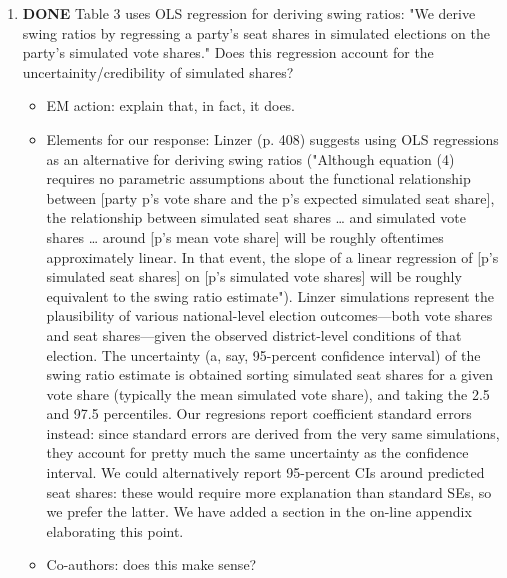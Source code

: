 \documentclass{article}
\begin{document}
\begin{enumerate}
\begin{itemize}
\end{itemize}
\item {\bfseries\sffamily DONE} Table 3 uses OLS regression for deriving swing ratios: "We derive swing ratios by regressing a party's seat shares in simulated elections on the party's simulated vote shares." Does this regression account for the uncertainity/credibility of simulated shares?
\label{sec:orgheadline29}
\begin{itemize}
\item EM action: explain that, in fact, it does.
\item Elements for our response: Linzer (p. 408) suggests using OLS regressions as an alternative for deriving swing ratios ("Although equation (4) requires no parametric assumptions about the functional relationship between [party p's vote share and the p's expected simulated seat share], the relationship between simulated seat shares \ldots{} and simulated vote shares \ldots{} around [p's mean vote share] will be roughly oftentimes approximately linear. In that event, the slope of a linear regression of [p's simulated seat shares] on [p's simulated vote shares] will be roughly equivalent to the swing ratio estimate"). Linzer simulations represent the plausibility of various national-level election outcomes---both vote shares and seat shares---given the observed district-level conditions of that election. The uncertainty (a, say, 95-percent confidence interval) of the swing ratio estimate is obtained sorting simulated seat shares for a given vote share (typically the mean simulated vote share), and taking the 2.5 and 97.5 percentiles. Our regresions report coefficient standard errors instead: since standard errors are derived from the very same simulations, they account for pretty much the same uncertainty as the confidence interval. We could alternatively report 95-percent CIs around predicted seat shares: these would require more explanation than standard SEs, so we prefer the latter. We have added a section in the on-line appendix elaborating this point.
\item Co-authors: does this make sense?
\end{itemize}
\end{enumerate}
\end{document}
